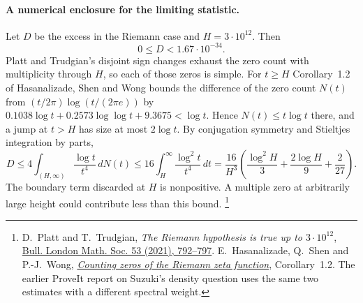 \paragraph{A numerical enclosure for the limiting statistic.}
Let $D$ be the excess in the Riemann case and $H=3\cdot10^{12}$.
Then
\[
 0\le D <1.67\cdot10^{-34}.
\]
Platt and Trudgian's disjoint sign changes exhaust the zero count with multiplicity through $H$, so each of those zeros is simple. For $t\ge H$ Corollary~1.2 of Hasanalizade, Shen and Wong
bounds the difference of the zero count $N(t)$ from
$(t/2\pi)\log(t/(2\pi e))$ by
$0.1038\log t+0.2573\log\log t+9.3675<\log t$.
Hence $N(t)\le t\log t$ there, and a jump at $t>H$ has size at most
$2\log t$. By conjugation symmetry and Stieltjes integration by parts,
\[
 D\le 4\int_{(H,\infty)}\frac{\log t}{t^4}\,dN(t)
 \le16\int_H^\infty\frac{\log^2t}{t^4}\,dt
 =\frac{16}{H^3}\left(\frac{\log^2H}3+
     \frac{2\log H}9+\frac2{27}\right).
\]
The boundary term discarded at $H$ is nonpositive. A multiple zero at
arbitrarily large height could contribute less than this bound.
\footnote{D.~Platt and T.~Trudgian,
\emph{The Riemann hypothesis is true up to $3\cdot10^{12}$},
\href{https://doi.org/10.1112/blms.12460}{Bull. London Math. Soc. 53 (2021), 792--797}.
E.~Hasanalizade, Q.~Shen and P.-J.~Wong,
\href{https://arxiv.org/abs/2107.06506}{\emph{Counting zeros of the Riemann zeta function}},
Corollary~1.2. The earlier ProveIt report on Suzuki's density question uses
the same two estimates with a different spectral weight.}
